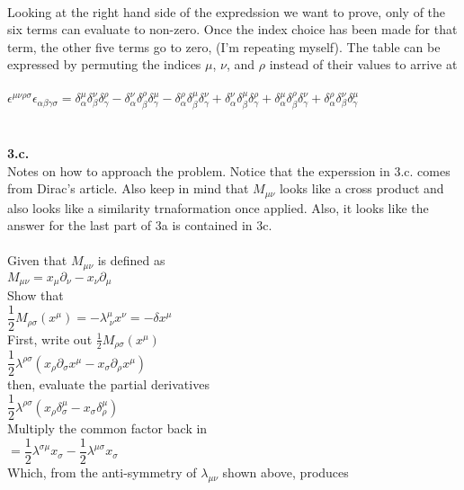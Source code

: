 \documentclass[prb,preprint]
{revtex4-1}
\newcommand{\PRLsep}{\noindent\makebox[\linewidth]{\resizebox{0.8888\linewidth}{2pt}{$\bullet$}}\bigskip}
\begin{document}
\\
Looking at the right hand side of the expredssion we want to prove, only of the six terms can evaluate to non-zero.  Once the index choice has been made for that term, the other five terms go to zero, (I'm repeating myself).  The table can be expressed by permuting the indices $\mu$, $\nu$, and $\rho$ instead of their values to arrive at
\\
\\
$\epsilon^{\mu\nu\rho\sigma}\epsilon_{\alpha\beta\gamma\sigma} = \delta^\mu_\alpha \delta^\nu_\beta \delta^\rho_\gamma - \delta^\nu_\alpha \delta^\rho_\beta \delta^\mu_\gamma - \delta^\rho_\alpha \delta^\mu_\beta \delta^\nu_\gamma + \delta^\nu_\alpha \delta^\mu_\beta \delta^\rho_\gamma + \delta^\mu_\alpha \delta^\rho_\beta \delta^\nu_\gamma + \delta^\rho_\alpha \delta^\nu_\beta \delta^\mu_\gamma$
\\
\PRLsep
\\
\\
\newpage
\textbf{3.c.}
\\
Notes on how to approach the problem.  Notice that the experssion in 3.c. comes from Dirac's article.  Also keep in mind that $M_{\mu\nu}$ looks like a cross product and also looks like a similarity trnaformation once applied.  Also, it looks like the answer for the last part of 3a is contained in 3c. 
\\
\\
Given that $M_{\mu\nu}$ is defined as 
\\
$M_{\mu\nu} = x_\mu\partial_\nu - x_\nu\partial_\mu$
\\
Show that 
\\
$\dfrac{1}{2} M_{\rho\sigma}\left(x^\mu\right) = -\lambda^\mu_{\;\nu} x^\nu = -\delta x^\mu$
\\
First, write out $\frac{1}{2}M_{\rho\sigma}\left(x^\mu\right)$
\\
$\dfrac{1}{2}\lambda^{\rho\sigma}\left(x_\rho \partial_\sigma x^\mu - x_\sigma \partial_\rho x^\mu\right)$
\\
then, evaluate the partial derivatives
\\
$\dfrac{1}{2}\lambda^{\rho\sigma}\left(x_\rho \delta^\mu_\sigma - x_\sigma \delta^\mu_\rho\right)$
\\
Multiply the common factor back in
\\
$= \dfrac{1}{2}\lambda^{\sigma\mu}x_\sigma - \dfrac{1}{2}\lambda^{\mu\sigma}x_\sigma$
\\
Which, from the anti-symmetry of $\lambda_{\mu\nu}$ shown above, produces
\\
\end{document}
